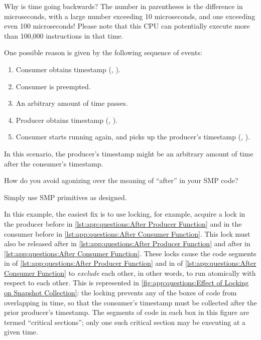 Why is time going backwards?
The number in parentheses is the difference in microseconds, with
a large number exceeding 10 microseconds, and one exceeding even
100 microseconds!
Please note that this CPU can potentially execute more than 100,000
instructions in that time.

\begin{fcvref}
One possible reason is given by the following sequence of events:
\begin{enumerate}
\item	Consumer obtains timestamp
	(,
	).
\item	Consumer is preempted.
\item	An arbitrary amount of time passes.
\item	Producer obtains timestamp
	(,
	).
\item	Consumer starts running again, and picks up the producer's
	timestamp
	(,
	).
\end{enumerate}

In this scenario, the producer's timestamp might be an arbitrary
amount of time after the consumer's timestamp.

How do you avoid agonizing over the meaning of ``after'' in your
SMP code?

Simply use SMP primitives as designed.

In this example, the easiest fix is to use locking, for example,
acquire a lock in the producer before  in
\cref{lst:app:questions:After Producer Function} and in
the consumer before  in
\cref{lst:app:questions:After Consumer Function}.
This lock must also be released after  in
\cref{lst:app:questions:After Producer Function} and
after  in
\cref{lst:app:questions:After Consumer Function}.
These locks cause the code segments in
 of
\cref{lst:app:questions:After Producer Function} and in
 of
\cref{lst:app:questions:After Consumer Function} to {\em exclude}
each other, in other words, to run atomically with respect to each other.
This is represented in
\cref{fig:app:questions:Effect of Locking on Snapshot Collection}:
the locking prevents any of the boxes of code from overlapping in time, so
that the consumer's timestamp must be collected after the prior
producer's timestamp.
The segments of code in each box in this figure are termed
``critical sections''; only one such critical section may be executing
at a given time.
\end{fcvref}

